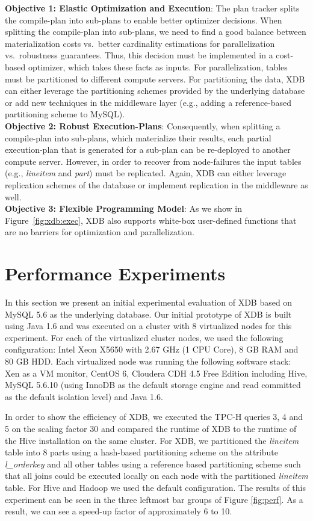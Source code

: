 \documentclass{sig-alternate}
\begin{document}
{\bf Objective 1:  Elastic Optimization and Execution}: The plan tracker splits the compile-plan into sub-plans to enable better optimizer decisions. When splitting the compile-plan into sub-plans, we need to find a good balance between materialization costs vs.\ better cardinality estimations for parallelization vs.\ robustness guarantees. Thus, this decision must be implemented in a cost-based optimizer, which takes these facts as inputs. For parallelization,  tables must be partitioned to different compute servers. For partitioning the data, XDB can either leverage the partitioning schemes provided by the underlying database or add new techniques in the middleware layer (e.g., adding a reference-based partitioning scheme to MySQL).\\

{\bf Objective 2:  Robust Execution-Plans}: Consequently, when splitting a compile-plan into sub-plans, which materialize their results, each partial execution-plan that is generated for a sub-plan can be re-deployed to another compute server. However, in order to recover from node-failures the input tables (e.g., \emph{lineitem} and \emph{part}) must be replicated. Again, XDB can either leverage replication schemes of the database or implement replication in the middleware as well.\\

{\bf Objective 3:  Flexible Programming Model}: As we show in Figure~\ref{fig:xdb:exec}, XDB also supports white-box user-defined functions that are no barriers for optimization and parallelization. 

\section{Performance Experiments}
\label{sec:perf}

In this section we present an initial experimental evaluation of XDB based on MySQL 5.6 as the underlying database. Our initial prototype of XDB is built using Java 1.6 and was executed on a cluster with 8 virtualized nodes for this experiment.  
For each of the virtualized cluster nodes, we used the following configuration: Intel Xeon X5650 with 2.67 GHz (1 CPU Core), 8 GB RAM and 80 GB HDD. Each virtualized node was running the following software stack: Xen as a VM monitor, CentOS 6, Cloudera CDH 4.5 Free Edition including Hive, MySQL 5.6.10 (using InnoDB as the default storage engine and read committed as the default isolation level) and Java 1.6.

In order to show the efficiency of XDB, we executed the TPC-H queries 3, 4 and 5 on the scaling factor 30 and compared the runtime of XDB to the runtime of the Hive installation on the same cluster. For XDB, we partitioned the \emph{lineitem} table into 8 parts using a hash-based partitioning scheme on the attribute \emph{l\_orderkey} and all other tables using a reference based partitioning scheme such that all joins could be executed locally on each node with the partitioned \emph{lineitem} table. For Hive and Hadoop we used the default configuration. The results of this experiment can be seen in the three leftmost bar groups of Figure \ref{fig:perf}. As a result, we can see a speed-up factor of approximately 6 to 10.
 
\end{document}
